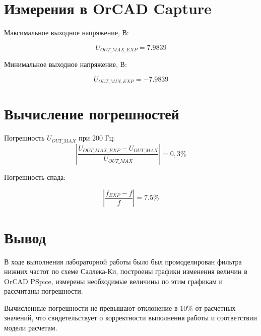 \chapter{Измерения в OrCAD Capture}

Максимальное выходное напряжение, В:   				          

\[
 U_{OUT\_MAX\_EXP}=7.9839
 \]

Минимальное выходное напряжение, В:

\[
U_{OUT\_MIN\_EXP}=-7.9839
\]

\chapter{Вычисление погрешностей}

Погрешность $U_{OUT\_MAX}$ при 200 Гц:
\[
\left| \frac{U_{OUT\_MAX\_EXP}-U_{OUT\_MAX}}{U_{OUT\_MAX}} \right|  =0,3\%
\]

Погрешность спада:

\[
\left| \frac{f_{EXP}-f}{f}\right| = 7.5 \%
\]

\chapter{Вывод}

В ходе выполнения лабораторной работы было был промоделирован фильтра нижних частот по схеме Саллека-Ки, построены графики изменения величин в OrCAD PSpice, измерены необходимые величины по этим графикам и рассчитаны погрешности.

Вычисленные погрешности не превышают отклонение в 10\% от расчетных значений, что свидетельствует о корректности выполнения работы и соответствии модели расчетам.



